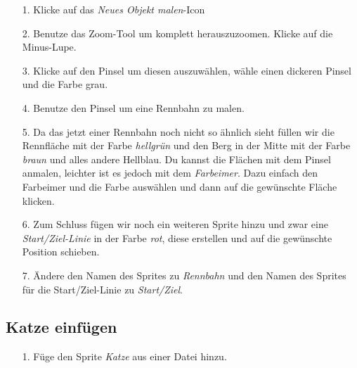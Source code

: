 \begin{itemize}
\item[1. ] Klicke auf das \textit{Neues Objekt malen}-Icon
\end{itemize}

\begin{itemize}
\item[2. ] Benutze das Zoom-Tool um komplett herauszuzoomen. Klicke auf die Minus-Lupe.
\end{itemize}

\begin{itemize}
\item[3. ] Klicke auf den Pinsel um diesen auszuwählen, wähle einen dickeren Pinsel und die Farbe grau.
\end{itemize}

\begin{itemize}
\item[4. ] Benutze den Pinsel um eine Rennbahn zu malen.
\end{itemize}

\begin{itemize}
\item[5. ] Da das jetzt einer Rennbahn noch nicht so ähnlich sieht füllen wir die Rennfläche mit der Farbe \emph{hellgrün} und den Berg in der Mitte mit der Farbe \emph{braun} und alles andere Hellblau. Du kannst die Flächen mit dem Pinsel anmalen, leichter ist es jedoch mit dem \emph{Farbeimer}. Dazu einfach den Farbeimer und die Farbe auswählen und dann auf die gewünschte Fläche klicken.
\end{itemize}

\begin{itemize}
\item[6. ] Zum Schluss fügen wir noch ein weiteren Sprite hinzu und zwar eine \emph{Start/Ziel-Linie} in der Farbe \emph{rot}, diese erstellen und auf die gewünschte Position schieben.
\end{itemize}

\begin{itemize}
\item[7.] Ändere den Namen des Sprites zu \textit{Rennbahn} und den Namen des Sprites für die Start/Ziel-Linie zu \textit{Start/Ziel}.
\end{itemize}

\subsection{Katze einfügen}

\begin{itemize}
\item[1.] Füge den Sprite \emph{Katze} aus einer Datei hinzu.
\end{itemize}

